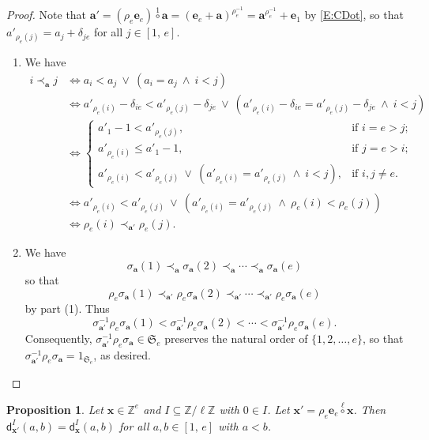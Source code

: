 \documentclass[11pt,a4paper,reqno]{amsart}
\numberwithin{equation}{section}
\theoremstyle{plain}
\newtheorem{prop}[thm]{Proposition}
\theoremstyle{definition}
\theoremstyle{remark}
\numberwithin{equation}{section}
\newcommand{\ba}{\mathbf{a}}
\newcommand{\bx}{\mathbf{x}}
\newcommand{\ZZ}{\mathbb{Z}}
\newcommand{\rr}{\rho}
\newcommand{\Be}{\mathbf{e}}
\newcommand{\sym}[1]{\mathfrak{S}_{#1}}
\newcommand{\CDot}[1]{\mathrel{\overset{#1}{\circ}}}
\newcommand{\dd}{\mathsf{d}}
\begin{document}
\begin{proof}
Note that
$\ba' = (\rr_e \Be_e) \CDot{1} \ba = (\Be_e + \ba)^{\rr_e^{-1}} = \ba^{\rr_e^{-1}} + \Be_1$ by \eqref{E:CDot},
so that $a'_{\rr_e(j)} = a_j + \delta_{je}$ for all $j \in [1,\,e]$.
\begin{enumerate}
\item
We have
\begin{align*}
i \prec_{\ba} j &\Leftrightarrow a_i < a_j\ \vee\ (a_i = a_j\ \wedge\ i < j) \\
& \Leftrightarrow a'_{\rr_e(i)} - \delta_{ie} < a'_{\rr_e(j)} - \delta_{je}\ \vee\ (a'_{\rr_e(i)} - \delta_{ie} = a'_{\rr_e(j)} - \delta_{je}\ \wedge\ i < j) \\
&\Leftrightarrow
\begin{cases}
a'_1 -1 < a'_{\rr_e(j)}, &\text{if } i = e > j; \\
a'_{\rr_e(i)} \leq a'_1-1, &\text{if } j = e > i; \\
a'_{\rr_e(i)} < a'_{\rr_e(j)}\ \vee\ (a'_{\rr_e(i)} = a'_{\rr_e(j)}\  \wedge\ i < j),
&\text{if } i, j \ne e.
\end{cases} \\
&\Leftrightarrow
a'_{\rr_e(i)} < a'_{\rr_e(j)}\ \vee\ (a'_{\rr_e(i)} = a'_{\rr_e(j)}\ \wedge\ \rr_e(i) < \rr_e(j)) \\
&\Leftrightarrow
\rr_e(i) \prec_{\ba'} \rr_e(j).
\end{align*}

\item We have
$$
\sigma_{\ba}(1) \prec_{\ba} \sigma_{\ba}(2) \prec_{\ba} \dotsb \prec_{\ba} \sigma_{\ba}(e)$$ so that
$$
\rr_e\sigma_{\ba}(1) \prec_{\ba'} \rr_e\sigma_{\ba}(2) \prec_{\ba'} \dotsb \prec_{\ba'} \rr_e\sigma_{\ba}(e)
$$
by part (1).  Thus %
$$\sigma_{\ba'}^{-1} \rr_e\sigma_{\ba}(1) < \sigma_{\ba'}^{-1} \rr_e\sigma_{\ba}(2) < \dotsb < \sigma_{\ba'}^{-1} \rr_e\sigma_{\ba}(e).$$
Consequently, $\sigma_{\ba'}^{-1} \rr_e\sigma_{\ba} \in \sym{e}$ preserves the natural order of $\{ 1,2,\dotsc, e \}$, so that $\sigma_{\ba'}^{-1} \rr_e\sigma_{\ba} = 1_{\sym{e}}$, as desired.
\end{enumerate}
\end{proof}


\begin{prop} \label{P:invariant}
Let $\bx \in \ZZ^e$ and $I \subseteq \ZZ/\ell\ZZ$ with $0 \in I$.
Let $\bx' = \rr_e\Be_{e}\CDot{\ell} \bx$.
Then $\dd^I_{\bx'}(a,b) = \dd^I_{\bx}(a,b)$ for all $a,b \in [1,\,e]$ with $a< b$.
\end{prop}
\end{document}
